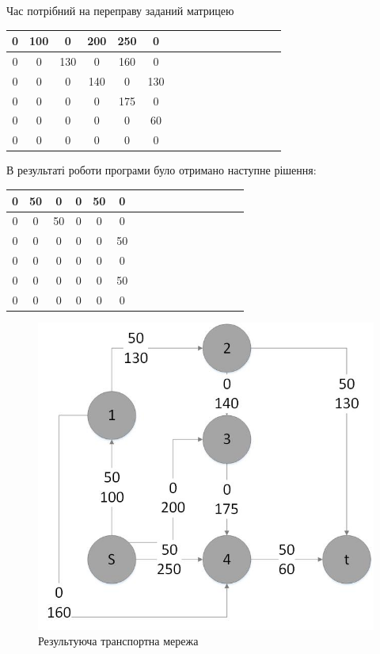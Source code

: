 \documentclass[a4paper,14pt,russian,ukrainian,oneside,final]{extreport}
\begin{document}
Час потрібний на переправу заданий матрицею
\begin{center}
\begin{tabular}{|c|c|c|c|c|c|c|c|c|c|c|c|c|c|c|c|}
\hline
0&100&0&200&250&0  \\ \hline
0&0&130&0&160&0    \\ \hline
0&0&0&140&0&130      \\ \hline
0&0&0&0&175&0      \\ \hline
0&0&0&0&0&60       \\ \hline
0&0&0&0&0&0        \\ \hline
\end{tabular}
\end{center}
\indent В результаті роботи програми було отримано наступне рішення:
\begin{center}
\begin{tabular}{|c|c|c|c|c|c|c|c|c|c|c|c|c|c|c|c|}
\hline
0&50&0&0&50&0\\ \hline
0&0&50&0&0&0 \\ \hline
0&0&0&0&0&50 \\ \hline
0&0&0&0&0&0  \\ \hline
0&0&0&0&0&50 \\ \hline
0&0&0&0&0&0  \\ \hline
\end{tabular}
\begin{figure}[h]
\begin{center}
\includegraphics[scale=0.6]{G3_1.jpg}
\caption{Результуюча транспортна мережа}
\end{center}
\end{figure}
\end{center}
\end{document}

